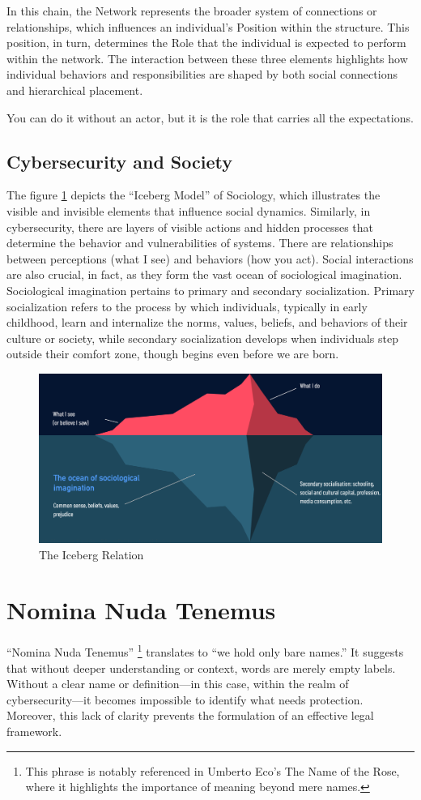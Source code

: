 In this chain, the Network represents the broader system of connections or relationships, which influences an individual’s Position within the structure. This position, in turn, determines the Role that the individual is expected to perform within the network. The interaction between these three elements highlights how individual behaviors and responsibilities are shaped by both social connections and hierarchical placement.

\begin{displayquote}
    You can do it without an actor, but it is the role that carries all the expectations.
\end{displayquote}

\clearpage
\subsection{Cybersecurity and Society}

The figure \ref{fig:Sociology_Iceberg} depicts the “Iceberg Model” of Sociology, which illustrates the visible and invisible elements that influence social dynamics. Similarly, in cybersecurity, there are layers of visible actions and hidden processes that determine the behavior and vulnerabilities of systems.
There are relationships between perceptions (what I see) and behaviors (how you act). Social interactions are also crucial, in fact, as they form the vast ocean of sociological imagination. Sociological imagination pertains to primary and secondary socialization. Primary socialization refers to the process by which individuals, typically in early childhood, learn and internalize the norms, values, beliefs, and behaviors of their culture or society, while secondary socialization develops when individuals step outside their comfort zone, though begins even before we are born.

\begin{figure}[H]
    \centering
    \includegraphics[width=0.5\linewidth]{Images/Sociology/Iceberg.png}
    \caption{The Iceberg Relation}
    \label{fig:Sociology_Iceberg}
\end{figure}

\section{Nomina Nuda Tenemus}
“Nomina Nuda Tenemus” \footnote{This phrase is notably referenced in Umberto Eco’s The Name of the Rose, where it highlights the importance of meaning beyond mere names.} translates to “we hold only bare names.” It suggests that without deeper understanding or context, words are merely empty labels. 
Without a clear name or definition—in this case, within the realm of cybersecurity—it becomes impossible to identify what needs protection. Moreover, this lack of clarity prevents the formulation of an effective legal framework.

